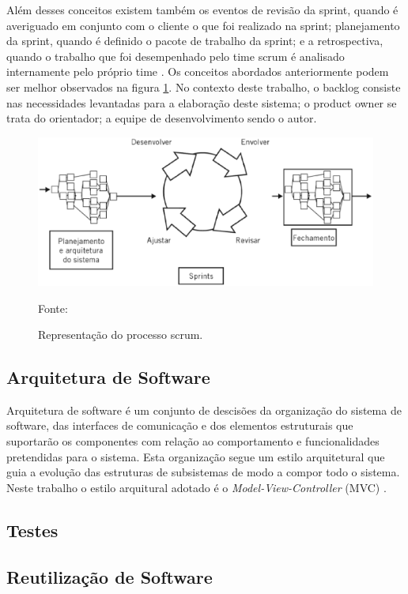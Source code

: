 Além desses conceitos existem também os eventos de revisão da sprint, quando é averiguado em conjunto com o cliente o que foi realizado na sprint; planejamento da sprint, quando é definido o pacote de trabalho da sprint; e a retrospectiva, quando o trabalho que foi desempenhado pelo time scrum é analisado internamente pelo próprio time \cite{prik2014}. Os conceitos abordados anteriormente podem ser melhor observados na figura \ref{fig:scrum}. No contexto deste trabalho, o backlog consiste nas necessidades levantadas para a elaboração deste sistema; o product owner se trata do orientador; a equipe de desenvolvimento sendo o autor.

\begin{figure}[h!]
	\centering
  	\includegraphics[width=.9\linewidth]{figuras/scrum.eps}
  	\caption{Representação do processo scrum.}
  	\small{Fonte: \cite{scrum2014}}
  	\label{fig:scrum}
\end{figure}

\subsection{Arquitetura de Software}

Arquitetura de software é um conjunto de descisões da organização do sistema de software, das interfaces de comunicação e dos elementos estruturais que suportarão os componentes com relação ao comportamento e funcionalidades pretendidas para o sistema. Esta organização segue um estilo arquitetural que guia a evolução das estruturas de subsistemas de modo a compor todo o sistema. Neste trabalho o estilo arquitural adotado é o \textit{Model-View-Controller} (MVC) \cite{clements2010}.



\subsection{Testes}

\subsection{Reutilização de Software}

